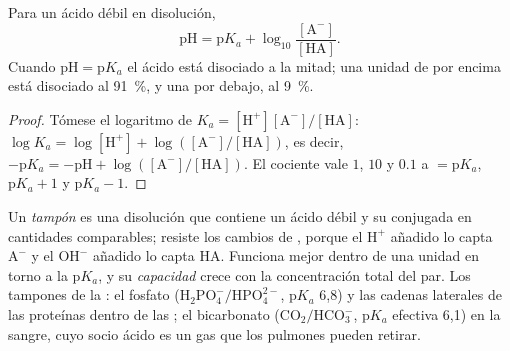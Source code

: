 \begin{theorem}\label{thm:b1:water-small-molecules:hh}
Para un ácido débil en disolución,
\[
\mathrm{pH} = \mathrm{p}K_a + \log_{10}\frac{[\mathrm{A^-}]}{[\mathrm{HA}]} .
\]
Cuando $\mathrm{pH} = \mathrm{p}K_a$ el ácido está disociado a la mitad; una
unidad de  por encima está disociado al \qty{91}{\%}, y una por debajo, al
\qty{9}{\%}.
\end{theorem}
\begin{proof}
Tómese el logaritmo de $K_a = [\mathrm{H^+}][\mathrm{A^-}]/[\mathrm{HA}]$:
$\log K_a = \log[\mathrm{H^+}] + \log([\mathrm{A^-}]/[\mathrm{HA}])$, es
decir, $-\mathrm{p}K_a = -\mathrm{pH} + \log([\mathrm{A^-}]/[\mathrm{HA}])$.
El cociente vale $1$, $10$ y $0.1$ a  $= \mathrm{p}K_a$, $\mathrm{p}K_a + 1$
y $\mathrm{p}K_a - 1$.
\end{proof}

\begin{definition}[Tampón]\label{def:b1:water-small-molecules:buffer}
Un \emph{tampón} es una disolución que contiene un ácido débil
y su  conjugada en cantidades comparables; resiste los cambios de ,
porque el $\mathrm{H^+}$ añadido lo capta $\mathrm{A^-}$ y el
$\mathrm{OH^-}$ añadido lo capta $\mathrm{HA}$. Funciona mejor dentro de una
unidad en torno a la p$K_a$, y su \emph{capacidad} crece con la
concentración total del par. Los tampones de la : el fosfato
($\mathrm{H_2PO_4^-}/\mathrm{HPO_4^{2-}}$, p$K_a$ 6,8) y las cadenas
laterales de las proteínas dentro de las ; el bicarbonato
($\mathrm{CO_2}/\mathrm{HCO_3^-}$, p$K_a$ efectiva 6,1) en la sangre, cuyo
socio ácido es un gas que los pulmones pueden retirar.
\end{definition}

